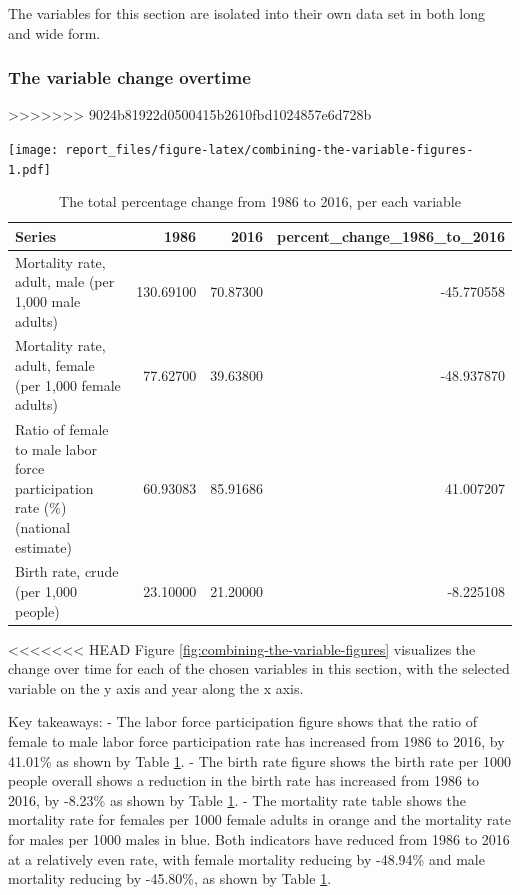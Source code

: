 \documentclass[11pt,a4paper,]{article}
\let\origfigure\figure
\let\endorigfigure\endfigure
\renewenvironment{figure}[1][2] {
    \expandafter\origfigure\expandafter[H]
} {
    \endorigfigure
}%
\begin{document}
The variables for this section are isolated into their own data set in both long and wide form.

\hypertarget{the-variable-change-overtime}{%
\subsubsection{The variable change overtime}\label{the-variable-change-overtime}}
>>>>>>> 9024b81922d0500415b2610fbd1024857e6d728b

\begin{figure}
\centering
\texttt{[image: report\_files/figure-latex/combining-the-variable-figures-1.pdf]}
\caption{\label{fig:combining-the-variable-figures}Each figure visualises the chosen variables}
\end{figure}

\begin{table}[!h]

\caption{\label{tab:percent-change-over-the-observed-time-period}The total percentage change from 1986 to 2016, per each variable}
\centering
\fontsize{7}{9}\selectfont
\begin{tabular}[t]{l|r|r|r}
\hline
Series & 1986 & 2016 & percent\_change\_1986\_to\_2016\\
\hline
Mortality rate, adult, male (per 1,000 male adults) & 130.69100 & 70.87300 & -45.770558\\
\hline
Mortality rate, adult, female (per 1,000 female adults) & 77.62700 & 39.63800 & -48.937870\\
\hline
Ratio of female to male labor force participation rate (\%) (national estimate) & 60.93083 & 85.91686 & 41.007207\\
\hline
Birth rate, crude (per 1,000 people) & 23.10000 & 21.20000 & -8.225108\\
\hline
\end{tabular}
\end{table}

<<<<<<< HEAD
Figure \ref{fig:combining-the-variable-figures} visualizes the change
over time for each of the chosen variables in this section, with the
selected variable on the y axis and year along the x axis.

Key takeaways: - The labor force participation figure shows that the
ratio of female to male labor force participation rate has increased
from 1986 to 2016, by 41.01\% as shown by Table
\ref{tab:percent-change-over-the-observed-time-period}. - The birth rate
figure shows the birth rate per 1000 people overall shows a reduction in
the birth rate has increased from 1986 to 2016, by -8.23\% as shown by
Table \ref{tab:percent-change-over-the-observed-time-period}. - The
mortality rate table shows the mortality rate for females per 1000
female adults in orange and the mortality rate for males per 1000 males
in blue. Both indicators have reduced from 1986 to 2016 at a relatively
even rate, with female mortality reducing by -48.94\% and male mortality
reducing by -45.80\%, as shown by Table
\ref{tab:percent-change-over-the-observed-time-period}.
\end{document}
